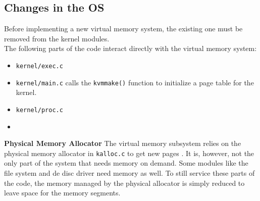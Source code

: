 




\subsection{Changes in the OS}
Before implementing a new virtual memory system, the existing one must be removed from the kernel
modules.\\

The following parts of the code interact directly with the virtual memory system:
\begin{itemize}
    \item \texttt{kernel/exec.c}
    \item \texttt{kernel/main.c} calls the \texttt{kvmmake()} function to initialize a page table for the kernel.
    \item \texttt{kernel/proc.c}
    \item
\end{itemize}

\textbf{Physical Memory Allocator} The virtual memory subsystem relies on the physical memory
allocator in \texttt{kalloc.c} to get new pages \cite{cox2011xv6}. It is, however, not the only
part of the system that needs memory on demand. Some modules like the file system and de disc driver
need memory as well. To still service these parts of the code, the memory managed by the physical
allocator is simply reduced to leave space for the memory segments.


